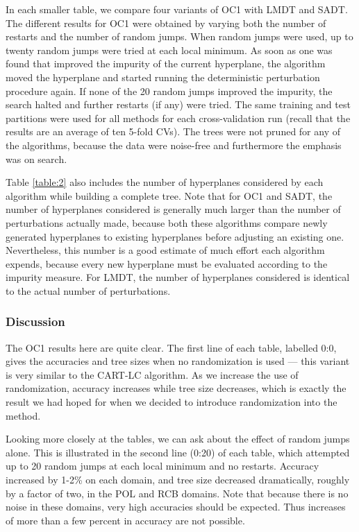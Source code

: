 In each smaller table, we compare four variants of OC1 with LMDT and
SADT\@.  The different results for OC1 were obtained by varying both
the number of restarts and the number of random jumps.  When random
jumps were used, up to twenty random jumps were tried at each local
minimum.  As soon as one was found that improved the impurity of the
current hyperplane, the algorithm moved the hyperplane and started
running the deterministic perturbation procedure again.  If none of
the 20 random jumps improved the impurity, the search halted and
further restarts (if any) were tried.  The same training and test
partitions were used for all methods for each cross-validation run
(recall that the results are an average of ten 5-fold CVs).  The
trees were not pruned for any of the algorithms, because the data were
noise-free and furthermore the emphasis was on search.

Table \ref{table:2} also includes the number of hyperplanes considered
by each algorithm while building a complete tree.  Note that for OC1
and SADT, the number of hyperplanes considered is generally much
larger than the number of perturbations actually made, because both
these algorithms compare newly generated hyperplanes to existing
hyperplanes before adjusting an existing one.  Nevertheless, this
number is a good estimate of much effort each algorithm expends,
because every new hyperplane must be evaluated according to the
impurity measure.  For LMDT, the number of hyperplanes considered is
identical to the actual number of perturbations.

\subsubsection{Discussion}

The OC1 results here are quite clear.  The first line of each table,
labelled 0:0, gives the accuracies and tree sizes when no
randomization is used --- this variant is very similar to the CART-LC
algorithm.  As we increase the use of randomization, accuracy
increases while tree size decreases, which is exactly the result we
had hoped for when we decided to introduce randomization into the
method.

Looking more closely at the tables, we can ask about the effect of
random jumps alone.  This is illustrated in the second line (0:20) of
each table, which attempted up to 20 random jumps at each local
minimum and no restarts.  Accuracy increased by 1-2\% on each domain,
and tree size decreased dramatically, roughly by a factor of two, in
the POL and RCB domains.  Note that because there is no noise in these
domains, very high accuracies should be expected.  Thus increases of
more than a few percent in accuracy are not possible.

